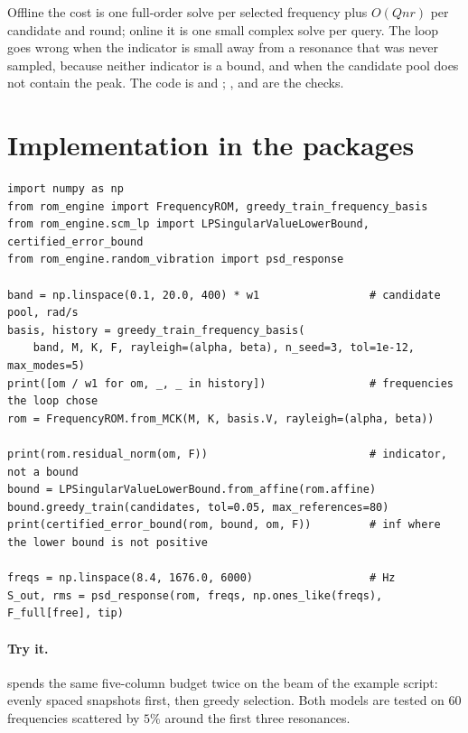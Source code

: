 Offline the cost is one full-order solve per selected frequency plus $O(Qnr)$ per candidate and round; online it is one small complex solve per query. The loop goes wrong when the indicator is small away from a resonance that was never sampled, because neither indicator is a bound, and when the candidate pool does not contain the peak. The code is  and ; ,  and  are the checks.


\section{Implementation in the packages}\label{sec:fr-impl}

\begin{lstlisting}[caption={Greedy training, the reduced model, indicators, a certified bound and a random-vibration RMS (K, M, C are free-dof matrices; F the load pattern).},label={lst:fr-run}]
import numpy as np
from rom_engine import FrequencyROM, greedy_train_frequency_basis
from rom_engine.scm_lp import LPSingularValueLowerBound, certified_error_bound
from rom_engine.random_vibration import psd_response

band = np.linspace(0.1, 20.0, 400) * w1                 # candidate pool, rad/s
basis, history = greedy_train_frequency_basis(
    band, M, K, F, rayleigh=(alpha, beta), n_seed=3, tol=1e-12, max_modes=5)
print([om / w1 for om, _, _ in history])                # frequencies the loop chose
rom = FrequencyROM.from_MCK(M, K, basis.V, rayleigh=(alpha, beta))

print(rom.residual_norm(om, F))                         # indicator, not a bound
bound = LPSingularValueLowerBound.from_affine(rom.affine)
bound.greedy_train(candidates, tol=0.05, max_references=80)
print(certified_error_bound(rom, bound, om, F))         # inf where the lower bound is not positive

freqs = np.linspace(8.4, 1676.0, 6000)                  # Hz
S_out, rms = psd_response(rom, freqs, np.ones_like(freqs), F_full[free], tip)
\end{lstlisting}

\paragraph{Try it.}  spends the same five-column budget twice on the beam of the example script: evenly spaced snapshots first, then greedy selection. Both models are tested on $60$ frequencies scattered by $5\%$ around the first three resonances.

